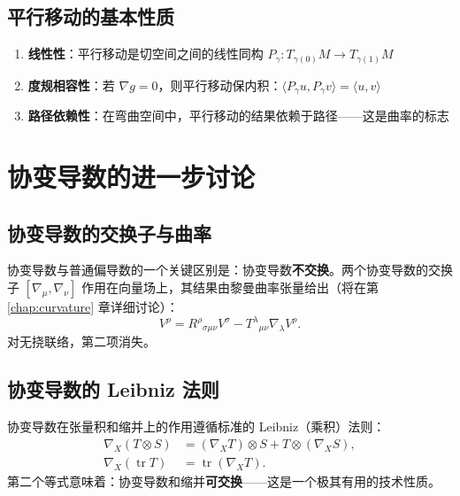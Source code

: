 \subsection{平行移动的基本性质}

\begin{property}[平行移动的性质]
\begin{enumerate}
    \item \textbf{线性性}：平行移动是切空间之间的线性同构 $P_{\gamma}: T_{\gamma(0)}M \to T_{\gamma(1)}M$
    \item \textbf{度规相容性}：若 $\nabla g = 0$，则平行移动保内积：$\langle P_\gamma u, P_\gamma v \rangle = \langle u, v \rangle$
    \item \textbf{路径依赖性}：在弯曲空间中，平行移动的结果依赖于路径——这是曲率的标志
\end{enumerate}
\end{property}

\section{协变导数的进一步讨论}

\subsection{协变导数的交换子与曲率}

协变导数与普通偏导数的一个关键区别是：协变导数\textbf{不交换}。两个协变导数的交换子 $[\nabla_\mu, \nabla_\nu]$ 作用在向量场上，其结果由黎曼曲率张量给出（将在第 \ref{chap:curvature} 章详细讨论）：
\begin{equation}
    [\nabla_\mu, \nabla_\nu] V^\rho = R^\rho{}_{\sigma\mu\nu} V^\sigma - T^\lambda{}_{\mu\nu} \nabla_\lambda V^\rho.
\end{equation}
对无挠联络，第二项消失。

\subsection{协变导数的 Leibniz 法则}

协变导数在张量积和缩并上的作用遵循标准的 Leibniz（乘积）法则：
\begin{align}
    \nabla_X (T \otimes S) &= (\nabla_X T) \otimes S + T \otimes (\nabla_X S), \\
    \nabla_X (\operatorname{tr} T) &= \operatorname{tr} (\nabla_X T).
\end{align}
第二个等式意味着：协变导数和缩并\textbf{可交换}——这是一个极其有用的技术性质。

